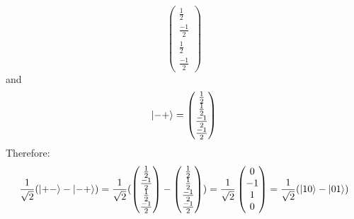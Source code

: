 \documentclass[12pt]{article}
\begin{document}
\begin{enumerate}[font=\bfseries]
\[\begin{pmatrix}
                \frac{1}{2} \\ \frac{-1}{2} \\ \frac{1}{2} \\ \frac{-1}{2} 
                \end{pmatrix}
                        \]
    and 
    \[\ket{-+} = \begin{pmatrix}
                \frac{1}{2} \\ \frac{1}{2} \\ \frac{-1}{2} \\ \frac{-1}{2} 
                \end{pmatrix}
                        \]
    Therefore:
    \[\frac{1}{\sqrt{2}}(\ket{+-} - \ket{-+}) = \frac{1}{\sqrt{2}} (\begin{pmatrix}
                \frac{1}{2} \\ \frac{-1}{2} \\ \frac{1}{2} \\ \frac{-1}{2} 
                \end{pmatrix} - \begin{pmatrix}
                \frac{1}{2} \\ \frac{1}{2} \\ \frac{-1}{2} \\ \frac{-1}{2} 
                \end{pmatrix} )  = \frac{1}{\sqrt{2}}
                \begin{pmatrix}
                0 \\ -1 \\ 1 \\ 0 
                \end{pmatrix} = \frac{1}{\sqrt{2}}(\ket{10} - \ket{01})
                        \]
\end{enumerate}
\end{document}
